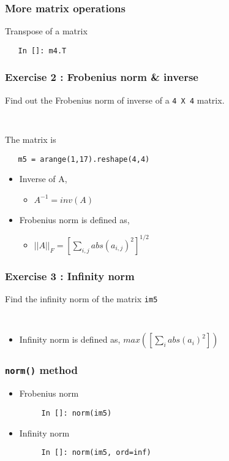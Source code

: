 \documentclass[presentation]{beamer}
\begin{document}
\begin{frame}[fragile]
\frametitle{More matrix operations}
\label{sec-9}

  Transpose of a matrix
\begin{verbatim}
   In []: m4.T
\end{verbatim}
\end{frame}
\begin{frame}[fragile]
\frametitle{Exercise 2 : Frobenius norm \& inverse}
\label{sec-10}

  Find out the Frobenius norm of inverse of a \texttt{4 X 4} matrix.
\begin{verbatim}
   
\end{verbatim}

  The matrix is
\begin{verbatim}
   m5 = arange(1,17).reshape(4,4)
\end{verbatim}

\begin{itemize}
\item Inverse of A,

\begin{itemize}
\item $A^{-1} = inv(A)$
\end{itemize}

\item Frobenius norm is defined as,

\begin{itemize}
\item $||A||_F = [\sum_{i,j} abs(a_{i,j})^2]^{1/2}$
\end{itemize}

\end{itemize}
\end{frame}
\begin{frame}[fragile]
\frametitle{Exercise 3 : Infinity norm}
\label{sec-11}

  Find the infinity norm of the matrix \texttt{im5}
\begin{verbatim}
   
\end{verbatim}

\begin{itemize}
\item Infinity norm is defined as,
       $max([\sum_{i} abs(a_{i})^2])$
\end{itemize}
\end{frame}
\begin{frame}[fragile]
\frametitle{\texttt{norm()} method}
\label{sec-12}

\begin{itemize}
\item Frobenius norm
\begin{verbatim}
     In []: norm(im5)
\end{verbatim}

\item Infinity norm
\begin{verbatim}
     In []: norm(im5, ord=inf)
\end{verbatim}

\end{itemize}
\end{frame}
\end{document}

